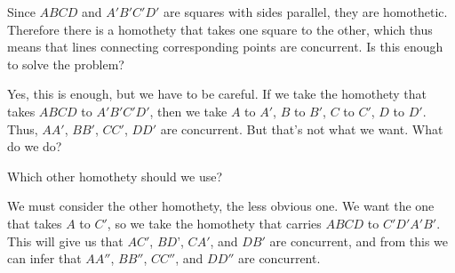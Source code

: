 



Since $ABCD$ and $A'B'C'D'$ are squares with sides parallel, they are homothetic. Therefore there is a homothety that takes one square to the other, which thus means that lines connecting corresponding points are concurrent. Is this enough to solve the problem?






Yes, this is enough, but we have to be careful. If we take the homothety that takes $ABCD$ to $A'B'C'D'$, then we take $A$ to $A'$, $B$ to $B'$, $C$ to $C'$, $D$ to $D'$. Thus, $AA'$, $BB'$, $CC'$, $DD'$ are concurrent. But that's not what we want. What do we do?


Which other homothety should we use?




We must consider the other homothety, the less obvious one. We want the one that takes $A$ to $C'$, so we take the homothety that carries $ABCD$ to $C'D'A'B'$. This will give us that $AC'$, $BD$', $CA'$, and $DB'$ are concurrent, and from this we can infer that $AA''$, $BB''$, $CC''$, and $DD''$ are concurrent.

